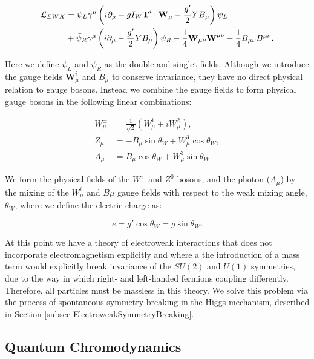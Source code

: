 \begin{equation}
\begin{split}
\mathcal{L}_{EWK} & = \bar{\psi}_L \gamma^{\mu} \left(i \partial_{\mu} - g I_W \textbf{T}^i \cdot \textbf{W}_{\mu} - \frac{g'}{2} Y B_{\mu}\right)\psi_L \\
& + \bar{\psi}_R \gamma^{\mu}\left(i \partial_{\mu} - \frac{g'}{2} Y B_{\mu}\right)\psi_R - \frac{1}{4}\textbf{W}_{\mu \nu}\textbf{W}^{\mu \nu} - \frac{1}{4} B_{\mu \nu} B^{\mu \nu} .
\end{split}
\end{equation}

Here we define $\psi_L$ and $\psi_R$ as the double and singlet fields. Although we introduce the gauge fields $\textbf{W}^i_{\mu}$ and $ B_{\mu}$ to conserve invariance, they have no direct physical relation to gauge bosons. Instead we combine the gauge fields to form physical gauge bosons in the following linear combinations:

\begin{align}
W^{\pm}_{\mu} & = \frac{1}{\sqrt{2}}(W^1_{\mu} \pm iW^2_{\mu}), \\
Z_{\mu} & = -B_{\mu}\sin\theta_W + W^3_{\mu}\cos\theta_W, \\
A_{\mu} & = B_{\mu}\cos\theta_W + W^3_{\mu}\sin\theta_W
\end{align}   

We form the physical fields of the $W^{\pm}$ and $Z^0$ bosons, and the photon ($A_{\mu}$) by the mixing of the $W^i_{\mu}$ and $B{\mu}$ gauge fields with respect to the weak mixing angle, $\theta_W$, where we define the electric charge as:

\begin{equation}
e = g'\cos\theta_W = g \sin\theta_W.
\end{equation}

At this point we have a theory of electroweak interactions that does not incorporate electromagnetism explicitly and where a the introduction of a mass term would explicitly break invariance of the $SU(2)$ and $U(1)$ symmetries, due to the way in which right- and left-handed fermions coupling differently. Therefore, all particles must be massless in this theory. We solve this problem via the process of spontaneous symmetry breaking in the Higgs mechanism, described in Section \ref{subsec-ElectroweakSymmetryBreaking}.  

\subsection{Quantum Chromodynamics} \label{subsec-QuantumChromodynamics}

